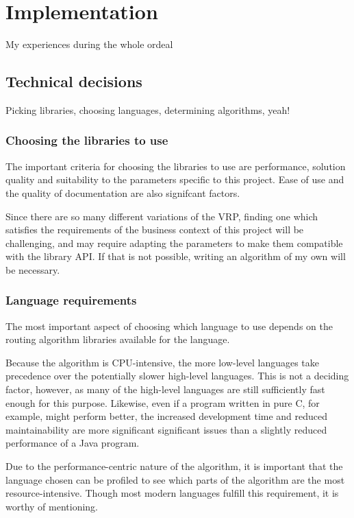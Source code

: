 \chapter{Implementation}
\label{chapter:implementation}

My experiences during the whole ordeal

\section{Technical decisions}

Picking libraries, choosing languages, determining algorithms, yeah!


\subsection{Choosing the libraries to use}

The important criteria for choosing the libraries to use are performance, solution quality and suitability to the parameters specific to this project. Ease of use and the quality of documentation are also signifcant factors.

Since there are so many different variations of the VRP, finding one which satisfies the requirements of the business context of this project will be challenging, and may require adapting the parameters to make them compatible with the library API. If that is not possible, writing an algorithm of my own will be necessary.


\subsection{Language requirements}

The most important aspect of choosing which language to use depends on the routing algorithm libraries available for the language. 

Because the algorithm is CPU-intensive, the more low-level languages take precedence over the potentially slower high-level languages. This is not a deciding factor, however, as many of the high-level languages are still sufficiently fast enough for this purpose. Likewise, even if a program written in pure C, for example, might perform better, the increased development time and reduced maintainability are more significant significant issues than a slightly reduced performance of a Java program.

Due to the performance-centric nature of the algorithm, it is important that the language chosen can be profiled to see which parts of the algorithm are the most resource-intensive. Though most modern languages fulfill this requirement, it is worthy of mentioning.


